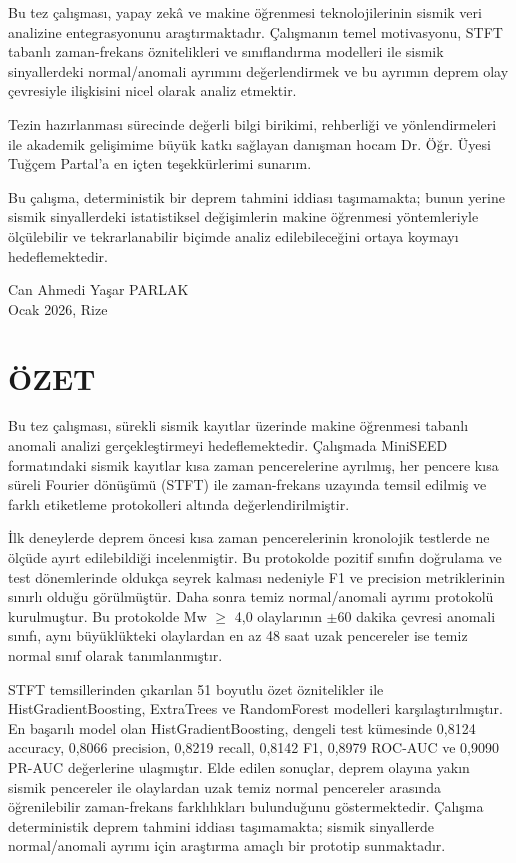 \documentclass[12pt,a4paper,oneside]{book}
\begin{document}
Bu tez çalışması, yapay zekâ ve makine öğrenmesi teknolojilerinin sismik veri analizine entegrasyonunu araştırmaktadır. Çalışmanın temel motivasyonu, STFT tabanlı zaman-frekans öznitelikleri ve sınıflandırma modelleri ile sismik sinyallerdeki normal/anomali ayrımını değerlendirmek ve bu ayrımın deprem olay çevresiyle ilişkisini nicel olarak analiz etmektir.

Tezin hazırlanması sürecinde değerli bilgi birikimi, rehberliği ve yönlendirmeleri ile akademik gelişimime büyük katkı sağlayan danışman hocam Dr. Öğr. Üyesi Tuğçem Partal'a en içten teşekkürlerimi sunarım.

Bu çalışma, deterministik bir deprem tahmini iddiası taşımamakta; bunun yerine sismik sinyallerdeki istatistiksel değişimlerin makine öğrenmesi yöntemleriyle ölçülebilir ve tekrarlanabilir biçimde analiz edilebileceğini ortaya koymayı hedeflemektedir.

\vspace{2cm}
\begin{flushright}
    Can Ahmedi Yaşar PARLAK\\
    Ocak 2026, Rize
\end{flushright}

\chapter*{ÖZET}

Bu tez çalışması, sürekli sismik kayıtlar üzerinde makine öğrenmesi tabanlı anomali analizi gerçekleştirmeyi hedeflemektedir. Çalışmada MiniSEED formatındaki sismik kayıtlar kısa zaman pencerelerine ayrılmış, her pencere kısa süreli Fourier dönüşümü (STFT) ile zaman-frekans uzayında temsil edilmiş ve farklı etiketleme protokolleri altında değerlendirilmiştir.

İlk deneylerde deprem öncesi kısa zaman pencerelerinin kronolojik testlerde ne ölçüde ayırt edilebildiği incelenmiştir. Bu protokolde pozitif sınıfın doğrulama ve test dönemlerinde oldukça seyrek kalması nedeniyle F1 ve precision metriklerinin sınırlı olduğu görülmüştür. Daha sonra temiz normal/anomali ayrımı protokolü kurulmuştur. Bu protokolde Mw $\geq$ 4,0 olaylarının $\pm$60 dakika çevresi anomali sınıfı, aynı büyüklükteki olaylardan en az 48 saat uzak pencereler ise temiz normal sınıf olarak tanımlanmıştır.

STFT temsillerinden çıkarılan 51 boyutlu özet öznitelikler ile HistGradientBoosting, ExtraTrees ve RandomForest modelleri karşılaştırılmıştır. En başarılı model olan HistGradientBoosting, dengeli test kümesinde 0,8124 accuracy, 0,8066 precision, 0,8219 recall, 0,8142 F1, 0,8979 ROC-AUC ve 0,9090 PR-AUC değerlerine ulaşmıştır. Elde edilen sonuçlar, deprem olayına yakın sismik pencereler ile olaylardan uzak temiz normal pencereler arasında öğrenilebilir zaman-frekans farklılıkları bulunduğunu göstermektedir. Çalışma deterministik deprem tahmini iddiası taşımamakta; sismik sinyallerde normal/anomali ayrımı için araştırma amaçlı bir prototip sunmaktadır.
\end{document}
